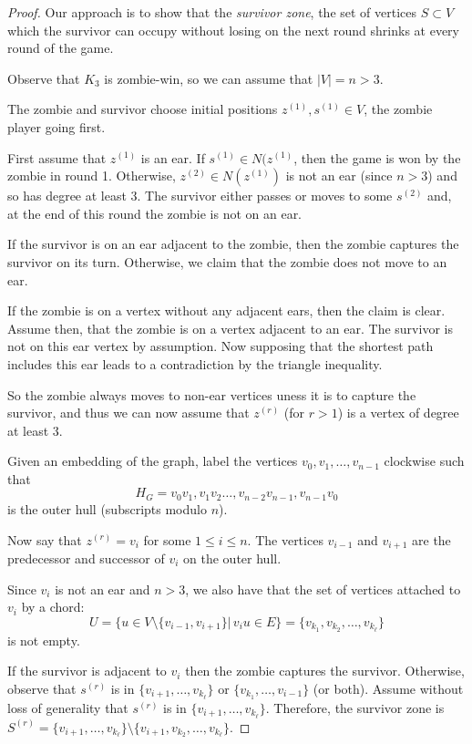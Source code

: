 \documentclass[letterpaper, 10pt]{article}
\begin{document}
\begin{proof}
Our approach is to show that the \emph{survivor zone}, the set of vertices $S \subset V$
which the survivor can occupy without losing on the next round shrinks at every round of the game.

Observe that $K_3$ is zombie-win, so we can assume that $|V| = n > 3$.

The zombie and survivor choose initial positions $z^{(1)}, s^{(1)} \in V$,
the zombie player going first.

First assume that $z^{(1)}$ is an ear. If $s^{(1)} \in N(z^{(1)}$, then the game is won by the zombie
in round 1.
Otherwise, $z^{(2)} \in N(z^{(1)})$ is not an ear (since $n > 3$) and so has
degree at least 3. The survivor either passes or moves to some $s^{(2)}$ and, at the end of this
round the zombie is not on an ear.

If the survivor is on an ear adjacent to the zombie, then the zombie captures the survivor on its turn.
Otherwise, we claim that the zombie does not move to an ear.

If the zombie is on a vertex without any adjacent ears, then the claim is clear.
Assume then, that the zombie is on a vertex adjacent to an ear.
The survivor is not on this ear vertex by assumption.
Now supposing that the shortest path includes this ear leads to a contradiction by the triangle
inequality.

So the zombie always moves to non-ear vertices uness it is to capture the survivor,
 and thus we can now assume that $z^{(r)}$ (for $r>1$) is a vertex of degree at least 3.

Given an embedding of the graph, label the vertices $v_0, v_1, \dots, v_{n-1}$ clockwise such that
\[H_G = v_0v_1, v_1v_2 \dots, v_{n-2}v_{n-1}, v_{n-1}v_0\] is the outer hull (subscripts modulo $n$).

Now say that $z^{(r)} = v_i$ for some $1 \leq i \leq n$. The vertices $v_{i-1}$
and $v_{i+1}$ are the predecessor and successor of $v_i$ on the outer hull.

Since $v_i$ is not an ear and $n>3$, we also have that the set of vertices attached to $v_i$ by a chord:
\[ U = \{ u \in V\setminus \{v_{i-1}, v_{i+1}\} \vert \, v_i u \in E \} = \{v_{k_1}, v_{k_2}, \dots, v_{k_\ell} \}\]
is not empty.


If the survivor is adjacent to $v_i$ then the zombie captures the survivor.
Otherwise, observe that $s^{(r)}$ is in $\{v_{i+1}, \dots, v_{k_\ell}\}$ or
$\{v_{k_1}, \dots, v_{i-1}\}$ (or both). Assume without loss of generality that
$s^{(r)}$ is in $\{v_{i+1}, \dots, v_{k_\ell}\}$. Therefore, the survivor zone is
$S^{(r)} = \{v_{i+1}, \dots, v_{k_\ell}\} \setminus \{v_{i+1}, v_{k_2}, \dots, v_{k_\ell}\}$.


\end{proof}
\end{document}
